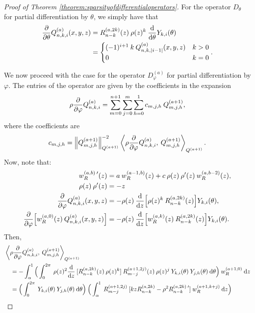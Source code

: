 \documentclass[11pt, oneside]{article}   	%
\begin{document}
\begin{proof}[Proof of Theorem \ref{theorem:sparsityofdifferentialoperators}]

For the operator $D_\theta$ for partial differentiation by $\theta$, we simply have that
\begin{align*}
	{\partial \over \partial \theta} Q_{n,k,i}^{(a)}(x,y,z) &= R_{n-k}^{(a,2k)}(z) \: \rho(z)^{k} \: {{\rm d} \over {\rm d} \theta} Y_{k,i}(\theta) \\
	&= 
	\begin{cases}
		(-1)^{i+1} \: k \: Q^{(a)}_{n,k,|i-1|}(x,y,z) & k > 0 \\
		0 & k = 0
	\end{cases}.
\end{align*}

We now proceed with the case for the operator $D_\varphi^{(a)}$ for partial differentiation by $\varphi$. The entries of the operator are given by the coefficients in the expansion 
$$
\rho {\partial \over \partial \varphi} Q_{n,k,i}^{(a)} = \sum_{m=0}^{n+1} \sum_{j=0}^m \sum_{h=0}^1 c_{m,j,h} \: Q_{m,j,h}^{(a+1)},
$$ 
where the coefficients are 
\begin{align*}
	c_{m,j,h} = \norm{\scopmjh^{(a+1)}}^{-2}_{\scop^{(a+1)}} \ip<\rhoppphi \scopnkia, \: \scopmjh^{(a+1)}>_{\scop^{(a+1)}}.
\end{align*}
Now, note that:
\begin{align*}
	w_R^{(a,b) \: \prime}(z) &= a \: w_R^{(a-1,b)}(z) + c \: \rho(z) \: \rho'(z) \:w_R^{(a,b-2)}(z), \\
	\rho(z) \: \rho'(z) &= -z \\
	{\partial \over \partial \varphi} Q_{n,k,i}^{(a)}(x,y,z) &= -\rho(z) \: {{\rm d} \over {\rm d} z} \Big[ \rho(z)^k \: R_{n-k}^{(a,2k)}(z) \Big] Y_{k,i}(\theta), \\
	{\partial \over \partial \varphi} \Big[ w_R^{(a,0)}(z) \: Q_{n,k,i}^{(a)}(x,y,z) \Big] &= -\rho(z) \: {{\rm d} \over {\rm d} z} \Big[ w_R^{(a,k)}(z) \: R_{n-k}^{(a,2k)}(z) \Big] Y_{k,i}(\theta).
\end{align*}
Then, 
\begin{align*}
	&\ip<\rhoppphi \scopnkia, \: \scopmjh^{(a+1)}>_{\scop^{(a+1)}} \\
	&\quad = - \int_\alpha^1 \Big( \int_0^{2\pi} \: \rho(z)^2 \ddz \: [\genjacnmk^{(a,2k)}(z) \: \rho(z)^k] \: \genjacmmj^{(a+1,2j)}(z) \: \rho(z)^j \: \chki(\theta) \: \chjh(\theta) \: \D \theta \Big) \: \genjacw^{(a+1, 0)} \: \D z \\
	&\quad = \Big( \int_0^{2\pi} \: \chki(\theta) \: \chjh(\theta) \: \D \theta \Big) \: \Big( \int_\alpha^1 \: \genjacmmj^{(a+1,2j)} \: [k z \genjacnmk^{(a, 2k)} - \rho^2 \genjacnmk^{(a, 2k) \: \prime}] \: \genjacw^{(a+1, k + j)} \: \D z \Big) \\

\end{align*}
\end{proof}
\end{document}
